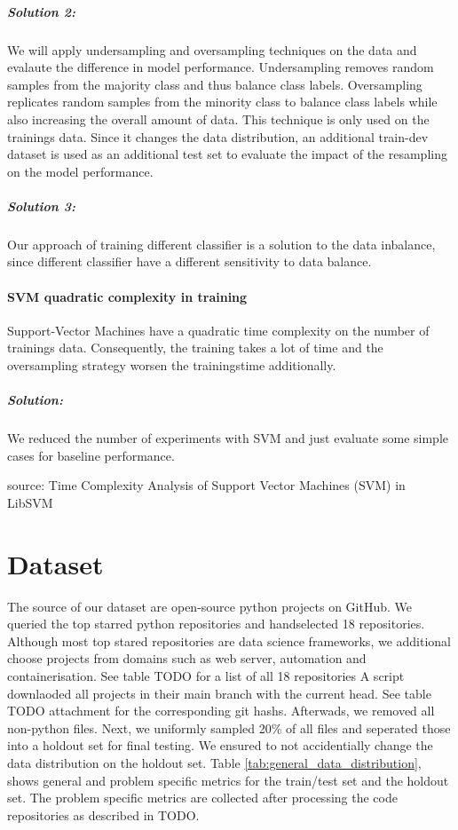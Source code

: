 \subparagraph{Solution 2:}
We will apply undersampling and oversampling techniques on the data and evalaute the difference in model performance. Undersampling removes random samples from the majority class and thus balance class labels. Oversampling replicates random samples from the minority class to balance class labels while also increasing the overall amount of data. This technique is only used on the trainings data. Since it changes the data distribution, an additional train-dev dataset is used as an additional test set to evaluate the impact of the resampling on the model performance. 

\subparagraph{Solution 3:}
Our approach of training different classifier is a solution to the data inbalance, since different classifier have a different sensitivity to data balance. 

\paragraph{SVM quadratic complexity in training}
Support-Vector Machines have a quadratic time complexity on the number of trainings data. Consequently, the training takes a lot of time and the oversampling strategy worsen the trainingstime additionally. 
\subparagraph{Solution:}
We reduced the number of experiments with SVM and just evaluate some simple cases for baseline performance. 

source: 
Time Complexity Analysis of Support Vector Machines
(SVM) in LibSVM

\section{Dataset}
The source of our dataset are open-source python projects on GitHub. We queried the top starred python repositories and handselected 18 repositories. Although most top stared repositories are data science frameworks, we additional choose projects from domains such as web server, automation and containerisation. See table TODO for a list of all 18 repositories
A script downlaoded all projects in their main branch with the current head. See table TODO attachment for the corresponding git hashs. Afterwads, we removed all non-python files. 
Next, we uniformly sampled 20\% of all files and seperated those into a holdout set for final testing. 
We ensured to not accidentially change the data distribution on the holdout set. Table \ref{tab:general_data_distribution}, shows general and problem specific metrics for the train/test set and the holdout set. The problem specific metrics are collected after processing the code repositories as described in TODO.


